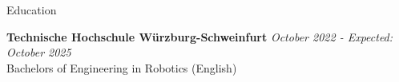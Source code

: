 \documentclass[
	a4paper, %
    10pt, %
]{resume} %
\begin{document}

\begin{rSection}{Education}

	\textbf{Technische Hochschule Würzburg-Schweinfurt} \hfill \textit{October 2022 - Expected: October 2025} \\
	Bachelors of Engineering in Robotics (English)

\end{rSection}

\end{document}
